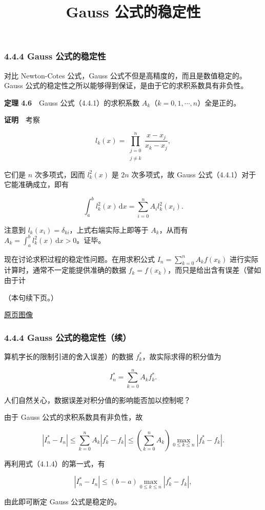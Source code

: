 \documentclass[
  10pt,
  fontset=fandol]{ctexart}
\title{Gauss 公式的稳定性}
\author{}
\date{}
\begin{document}
\maketitle

\subsubsection{4.4.4 Gauss 公式的稳定性}\label{gauss-ux516cux5f0fux7684ux7a33ux5b9aux6027}

对比 Newton-Cotes 公式，Gauss 公式不但是高精度的，而且是数值稳定的。Gauss 公式的稳定性之所以能够得到保证，是由于它的求积系数具有非负性。

\textbf{定理 4.6}　Gauss 公式（4.4.1）的求积系数 \(A_k\)（\(k=0,1,\cdots,n\)）全是正的。

\textbf{证明}　考察

\[
l_k(x)=\prod_{\substack{j=0\\j\ne k}}^{n}\frac{x-x_j}{x_k-x_j},
\]

它们是 \(n\) 次多项式，因而 \(l_k^2(x)\) 是 \(2n\) 次多项式，故 Gauss 公式（4.4.1）对于它能准确成立，即有

\[
\int_a^b l_k^2(x)\,\mathrm{d}x=\sum_{i=0}^{n}A_i l_k^2(x_i).
\]

注意到 \(l_k(x_i)=\delta_{ki}\)，上式右端实际上即等于 \(A_k\)，从而有 \(\displaystyle A_k=\int_a^b l_k^2(x)\,\mathrm{d}x>0\)。证毕。

现在讨论求积过程的稳定性问题。在用求积公式 \(\displaystyle I_n=\sum_{k=0}^{n}A_kf(x_k)\) 进行实际计算时，通常不一定能提供准确的数据 \(f_k=f(x_k)\)，而只是给出含有误差（譬如由于计

（本句续下页。）

\href{../../source-images/pdf-110.jpeg}{原页图像}

\subsubsection{4.4.4 Gauss 公式的稳定性（续）}\label{gauss-ux516cux5f0fux7684ux7a33ux5b9aux6027ux7eed}

算机字长的限制引进的舍入误差）的数据 \(f_k^*\)，故实际求得的积分值为

\[
I_n^*=\sum_{k=0}^{n}A_kf_k^*.
\]

人们自然关心，数据误差对积分值的影响能否加以控制呢？

由于 Gauss 公式的求积系数具有非负性，故

\[
|I_n^*-I_n|\leq\sum_{k=0}^{n}A_k|f_k^*-f_k|
\leq\left(\sum_{k=0}^{n}A_k\right)\max_{0\leq k\leq n}|f_k^*-f_k|.
\]

再利用式（4.1.4）的第一式，有

\[
|I_n^*-I_n|\leq(b-a)\max_{0\leq k\leq n}|f_k^*-f_k|,
\]

由此即可断定 Gauss 公式是稳定的。
\end{document}
